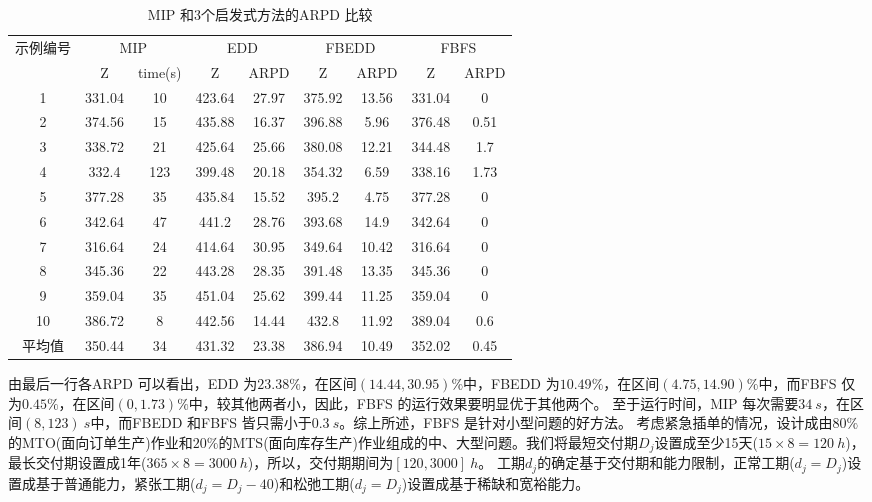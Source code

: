 \begin{table}[h]
  \centering\xiaowu
  \caption{MIP 和3个启发式方法的ARPD 比较\label{tab:comparisonforarpd}}
    \begin{tabular}{ccccccccc}
    \toprule
    \multirow{2}[4]{*}{示例编号} & \multicolumn{2}{c}{MIP} & \multicolumn{2}{c}{EDD} & \multicolumn{2}{c}{FBEDD} & \multicolumn{2}{c}{FBFS} \\
   \cmidrule(lr){2-3}\cmidrule(lr){4-5}\cmidrule(lr){6-7}\cmidrule(lr){8-9}
          & Z     & time(s) & Z     & ARPD  & Z     & ARPD  & Z     & ARPD \\
      \midrule
    1     & 331.04 & 10    & 423.64 & 27.97 & 375.92 & 13.56 & 331.04 & 0 \\
    2     & 374.56 & 15    & 435.88 & 16.37 & 396.88 & 5.96  & 376.48 & 0.51 \\
    3     & 338.72 & 21    & 425.64 & 25.66 & 380.08 & 12.21 & 344.48 & 1.7 \\
    4     & 332.4 & 123   & 399.48 & 20.18 & 354.32 & 6.59  & 338.16 & 1.73 \\
    5     & 377.28 & 35    & 435.84 & 15.52 & 395.2 & 4.75  & 377.28 & 0 \\
    6     & 342.64 & 47    & 441.2 & 28.76 & 393.68 & 14.9  & 342.64 & 0 \\
    7     & 316.64 & 24    & 414.64 & 30.95 & 349.64 & 10.42 & 316.64 & 0 \\
    8     & 345.36 & 22    & 443.28 & 28.35 & 391.48 & 13.35 & 345.36 & 0 \\
    9     & 359.04 & 35    & 451.04 & 25.62 & 399.44 & 11.25 & 359.04 & 0 \\
    10    & 386.72 & 8     & 442.56 & 14.44 & 432.8 & 11.92 & 389.04 & 0.6 \\[3pt]
    平均值   & 350.44 & 34    & 431.32 & 23.38 & 386.94 & 10.49 & 352.02 & 0.45 \\
    \bottomrule
    \end{tabular}
\end{table}
由最后一行各ARPD 可以看出，EDD 为$23.38\%$，在区间$(14.44,30.95)\%$中，FBEDD 为$10.49\%$，在区间$(4.75,14.90)\%$中，而FBFS 仅为$0.45\%$，在区间$(0,1.73)\%$中，较其他两者小，因此，FBFS 的运行效果要明显优于其他两个。
至于运行时间，MIP 每次需要$34\ s$，在区间$(8,123)\ s$中，而FBEDD 和FBFS 皆只需小于$0.3\ s$。综上所述，FBFS 是针对小型问题的好方法。
考虑紧急插单的情况，设计成由$80\%$的MTO(面向订单生产)作业和$20\%$的MTS(面向库存生产)作业组成的中、大型问题。我们将最短交付期$D_j$设置成至少15天($15\times 8 = 120\ h$)，最长交付期设置成1年($365\times 8 = 3000\ h$)，所以，交付期期间为$[120,3000]\ h$。
工期$d_j$的确定基于交付期和能力限制，正常工期($d_j = D_j$)设置成基于普通能力，紧张工期($d_j = D_j - 40$)和松弛工期($d_j = D_j$)设置成基于稀缺和宽裕能力。

